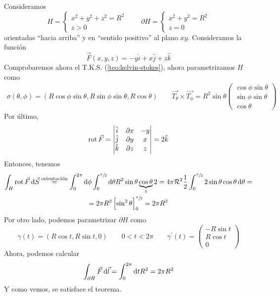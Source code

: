 \begin{example*}
    Consideramos
    \[
        H =
        \begin{cases}
            x^2 + y^2 + z^2 = R^2 \\ z > 0
        \end{cases}
        \qquad
        \partial H  =
        \begin{cases}
            x^2 + y^2 = R^2 \\ z = 0
        \end{cases}
    \]
    orientadas ``hacia arriba'' y en ``sentido positivo'' al plano $xy$. Consideramos la función
    \[
        \vec{F}(x, y, z) = -y \hat{i} + x \hat{j} + z \hat{k}
    \]
    Comprobaremos ahora el T.K.S. (\ref{teo:kelvin-stokes}), ahora parametrizamos $H$ como
    \begin{gather*}
        \sigma\left( \theta, \phi \right) = \left( R\cos\phi\sin\theta, R\sin\phi\sin\theta, R\cos\theta \right)
        \qquad
        \vec{T_\theta} \times \vec{T_\phi} = R^2 \sin\theta
        \begin{pmatrix}
            \cos\phi\sin\theta \\ \sin\phi\sin\theta \\ \cos\theta
        \end{pmatrix}
    \end{gather*}
    Por último, 
    \[
        \operatorname{rot} \vec{F} = \begin{vmatrix}\hat{i} & \partial x & - y \\ \hat{j} & \partial y & x \\ \hat{k} & \partial z & z\end{vmatrix} = 2 \hat{k}
    \]
    Entonces, tenemos
    \begin{gather*}
        \int_H \rot \vec{F} \dif \vec{S} \stackrel{\text{orientación}}{=} \int^{2\pi}_0 \dif \phi \int^{\sfrac{\pi}{2}}_0 \dif \theta R^2 \sin \theta \underbrace{\cos\theta}_
        {z} 2 = 4 \pi \R^2 \frac{1}{2} \int^{\sfrac{\pi}{2}}_0 2 \sin\theta\cos\theta \dif \theta =\\= 2\pi R^2 \left[ \sin^2 \theta \right]^{\sfrac{\pi}{2}}_0 = 2\pi R^2
    \end{gather*}
    Por otro lado, podemos parametrizar $\partial H$ como
    \[
        \gamma(t) = \left( R\cos t, R \sin t, 0 \right) \qquad 0 < t < 2\pi \qquad
        \gamma^\prime (t) =
        \begin{pmatrix}
            -R \sin t \\ R \cos t \\ 0
        \end{pmatrix}
    \]
    Ahora, podemos calcular
    \[
        \int_{\partial H} \vec{F} \dif \vec{l} = \int^{2\pi}_{0} \dif t R^2 = 2 \pi R^2 
    \]
    Y como vemos, se satisface el teorema.
\end{example*}

